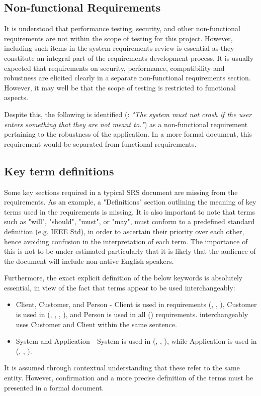 \subsection{Non-functional Requirements}
\label{sec:non-functional-requirements}
It is understood that performance testing, security, and other non-functional requirements are not within the scope of testing for this project.
However, including such items in the system requirements review is essential as they constitute an integral part of the requirements development process. It is usually expected that requirements on security, performance, compatibility and robustness are elicited clearly in a separate non-functional requirements section.  However, it may well be that the scope of testing is restricted to functional aspects.
\par
Despite this, the following is identified (\RSeven: \textit{"The system must not crash if the user enters something that they are not meant to."}) as a non-functional requirement pertaining to the robustness of the application. In a more formal document, this requirement would be separated from functional requirements.

\subsection{Key term definitions}
\label{sec:key-term-definitions}

Some key sections required in a typical SRS document are missing from the requirements.  As an example, a "Definitions" section outlining the meaning of key terms used in the requirements is missing.  It is also important to note that terms such as "will", "should", "must", or "may", must conform to a predefined standard definition (e.g. IEEE Std), in order to ascertain their priority over each other, hence avoiding confusion in the interpretation of each term. The importance of this is not to be under-estimated particularly that it is likely that the audience of the document will include non-native English speakers.
\par
Furthermore, the exact explicit definition of the below keywords is absolutely essential, in view of the fact that terms appear to be used interchangeably:
\begin{itemize}
    \item Client, Customer, and Person - Client is used in requirements (\ROne, \RTwo, \RFive), Customer is used in (\RTwo, \RThree, \RFour, \RFive), and Person is used in all (\REight) requirements. \RFive \space interchangeably uses Customer and Client within the same sentence. 
    \item System and Application - System is used in (\RTwo, \RSix, \RSeven), while Application is used in (\ROne, \RFour, \RFive). 
\end{itemize}
It is assumed through contextual understanding that these refer to the same entity.  However, confirmation and a more precise definition of the terms must be presented in a formal document.

